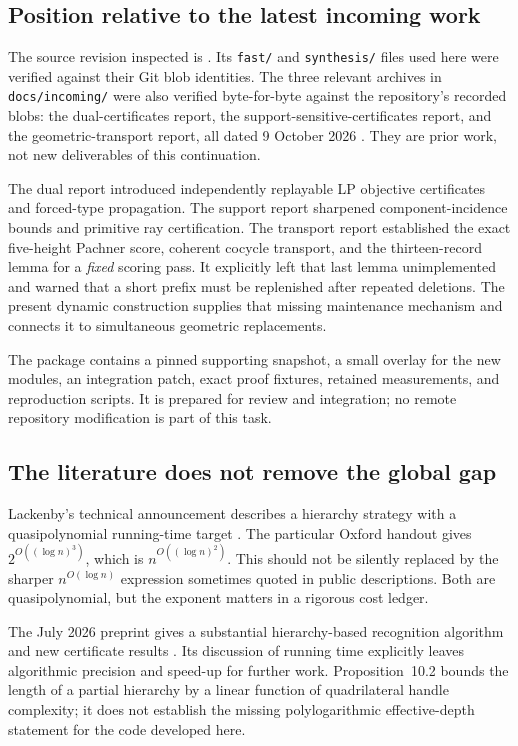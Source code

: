 \subsection{Position relative to the latest incoming work}

The source revision inspected is \basecommit. Its \texttt{fast/} and
\texttt{synthesis/} files used here were verified against their Git blob
identities. The three relevant archives in \texttt{docs/incoming/} were
also verified byte-for-byte against the repository's recorded blobs:
the dual-certificates report, the support-sensitive-certificates report,
and the geometric-transport report, all dated 9 October 2026
\cite{priorDual,priorSupport,priorTransport}. They are prior work, not new
deliverables of this continuation.

The dual report introduced independently replayable LP objective
certificates and forced-type propagation. The support report sharpened
component-incidence bounds and primitive ray certification. The transport
report established the exact five-height Pachner score, coherent cocycle
transport, and the thirteen-record lemma for a \emph{fixed} scoring pass.
It explicitly left that last lemma unimplemented and warned that a short
prefix must be replenished after repeated deletions. The present dynamic
construction supplies that missing maintenance mechanism and connects it
to simultaneous geometric replacements.

The package contains a pinned supporting snapshot, a small overlay for
the new modules, an integration patch, exact proof fixtures, retained
measurements, and reproduction scripts. It is prepared for review and
integration; no remote repository modification is part of this task.

\subsection{The literature does not remove the global gap}

Lackenby's technical announcement describes a hierarchy strategy with a
quasipolynomial running-time target \cite{LackenbyTalk}. The particular
Oxford handout gives $2^{O((\log n)^3)}$, which is
$n^{O((\log n)^2)}$. This should not be silently replaced by the sharper
$n^{O(\log n)}$ expression sometimes quoted in public descriptions.
Both are quasipolynomial, but the exponent matters in a rigorous cost
ledger.

The July 2026 preprint gives a substantial hierarchy-based recognition
algorithm and new certificate results \cite{Lackenby2026}. Its discussion
of running time explicitly leaves algorithmic precision and speed-up
for further work. Proposition~10.2 bounds the length of a partial
hierarchy by a linear function of quadrilateral handle complexity; it
does not establish the missing polylogarithmic effective-depth statement
for the code developed here.

